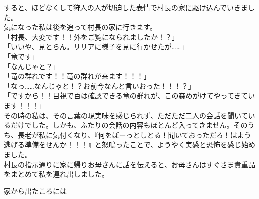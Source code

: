 \documentclass[oneside, a4paper]{jsbook}
\begin{document}
すると、ほどなくして狩人の人が切迫した表情で村長の家に駆け込んでいきました。\\
気になった私は後を追って村長の家に行きます。\\

\noindent
「村長、大変です！！外をご覧になられましたか！？」\\
「いいや、見とらん。リリアに様子を見に行かせたが……」\\
「竜です」\\
「なんじゃと？」\\
「竜の群れです！！竜の群れが来ます！！！」\\
「なっ……なんじゃと！？お前今なんと言いおった！！！？」\\
「ですから！！目視で百は確認できる竜の群れが、この森めがけてやってきています！！！」\\

その時の私は、その言葉の現実味を感じられず、ただただ二人の会話を聞いているだけでした。しかも、ふたりの会話の内容もほとんど入ってきません。そのうち、長老が私に気付くなり、『何をぼーっとしとる！聞いておっただろ！はよう逃げる準備をせんか！！！』と怒鳴ったことで、ようやく実感と恐怖を感じ始めました。\\

村長の指示通りに家に帰りお母さんに話を伝えると、お母さんはすぐさま貴重品をまとめて私を連れ出しました。

家から出たころには
\end{document}
